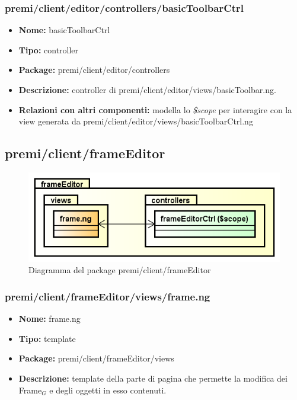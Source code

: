 \subsubsection{premi/client/editor/controllers/basicToolbarCtrl}
\begin{itemize}
  \item[] \textbf{Nome:} basicToolbarCtrl
  \item[] \textbf{Tipo:} controller
  \item[] \textbf{Package:} premi/client/editor/controllers
  \item[] \textbf{Descrizione:} controller di premi/client/editor/views/basicToolbar.ng.
  \item[] \textbf{Relazioni con altri componenti:} modella lo \textit{\$scope} per interagire con la view generata da premi/client/editor/views/basicToolbarCtrl.ng
\end{itemize}


\subsection{premi/client/frameEditor}
\begin{figure}[!h]
\begin{center}
\includegraphics[scale=0.45]{img/diapkg/frameEditor.png}
\caption{Diagramma del package premi/client/frameEditor}
\end{center}
\end{figure}
\subsubsection{premi/client/frameEditor/views/frame.ng}
\begin{itemize}
  \item[] \textbf{Nome:} frame.ng
  \item[] \textbf{Tipo:} template
  \item[] \textbf{Package:} premi/client/frameEditor/views
  \item[] \textbf{Descrizione:} template della parte di pagina che permette la modifica dei Frame$_G$ e degli oggetti in esso contenuti.
\end{itemize}
